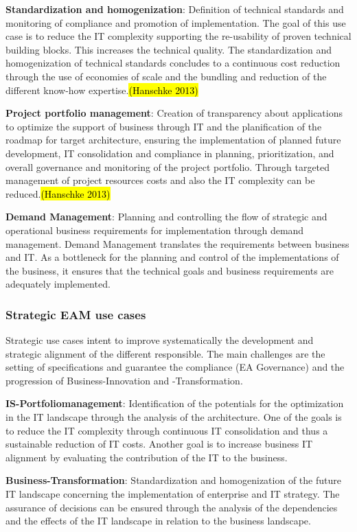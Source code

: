 \textbf{Standardization and homogenization}: Definition of technical standards and monitoring of compliance and promotion of implementation. The goal of this use case is to reduce the IT complexity supporting the re-usability of proven technical building blocks. This increases the technical quality. The standardization and homogenization of technical standards concludes to a continuous cost reduction through the use of economies of scale and the bundling and reduction of the different know-how expertise.\hl{(Hanschke 2013)}

\textbf{Project portfolio management}: Creation of transparency about applications to optimize the support of business through IT and the planification of the roadmap for target architecture, ensuring the implementation of planned future development, IT consolidation and compliance in planning, prioritization, and overall governance and monitoring of the project portfolio. Through targeted management of project resources costs and also the IT complexity can be reduced.\hl{(Hanschke 2013)}

\textbf{Demand Management}: Planning and controlling the flow of strategic and operational business requirements for implementation through demand management. Demand Management translates the requirements between business and IT. As a bottleneck for the planning and control of the implementations of the business, it ensures that the technical goals and business requirements are adequately implemented.

\subsubsection{Strategic EAM use cases}
Strategic use cases intent to improve systematically the development and strategic alignment of the different responsible. The main challenges are the setting of specifications and guarantee the compliance (EA Governance) and the progression of Business-Innovation and -Transformation.

\textbf{IS-Portfoliomanagement}: Identification of the potentials for the optimization in the IT landscape through the analysis of the architecture. One of the goals is to reduce the IT complexity through continuous IT consolidation and thus a sustainable reduction of IT costs. Another goal is to increase business IT alignment by evaluating the contribution of the IT to the business.

\textbf{Business-Transformation}: Standardization and homogenization of the future IT landscape
concerning the implementation of enterprise and IT strategy. The assurance of decisions can be ensured through the analysis of the dependencies and the effects of the IT landscape in relation to the business landscape.


